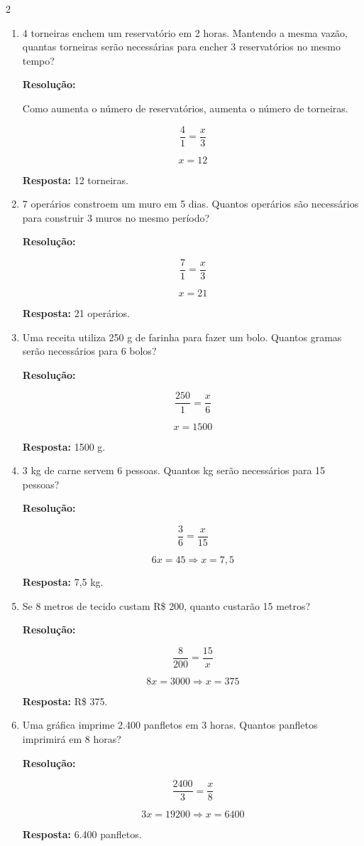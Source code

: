\documentclass[11pt]{article}
\begin{document}
\begin{multicols}{2}
\begin{enumerate}[leftmargin=*]
\item 4 torneiras enchem um reservatório em 2 horas. Mantendo a mesma vazão, quantas torneiras serão necessárias para encher 3 reservatórios no mesmo tempo?

\textbf{Resolução:}

Como aumenta o número de reservatórios, aumenta o número de torneiras.

\[
\frac{4}{1} = \frac{x}{3}
\]

\[
x = 12
\]

\textbf{Resposta:} 12 torneiras.

\item 7 operários constroem um muro em 5 dias. Quantos operários são necessários para construir 3 muros no mesmo período?

\textbf{Resolução:}

\[
\frac{7}{1} = \frac{x}{3}
\]

\[
x = 21
\]

\textbf{Resposta:} 21 operários.

\item Uma receita utiliza 250 g de farinha para fazer um bolo. Quantos gramas serão necessários para 6 bolos?

\textbf{Resolução:}

\[
\frac{250}{1} = \frac{x}{6}
\]

\[
x = 1500
\]

\textbf{Resposta:} 1500 g.

\item 3 kg de carne servem 6 pessoas. Quantos kg serão necessários para 15 pessoas?

\textbf{Resolução:}

\[
\frac{3}{6} = \frac{x}{15}
\]

\[
6x = 45
\Rightarrow x = 7{,}5
\]

\textbf{Resposta:} 7,5 kg.

\item Se 8 metros de tecido custam R\$ 200, quanto custarão 15 metros?

\textbf{Resolução:}

\[
\frac{8}{200} = \frac{15}{x}
\]

\[
8x = 3000
\Rightarrow x = 375
\]

\textbf{Resposta:} R\$ 375.

\item Uma gráfica imprime 2.400 panfletos em 3 horas. Quantos panfletos imprimirá em 8 horas?

\textbf{Resolução:}

\[
\frac{2400}{3} = \frac{x}{8}
\]

\[
3x = 19200
\Rightarrow x = 6400
\]

\textbf{Resposta:} 6.400 panfletos.

\end{enumerate}

\end{multicols}
\end{document}
